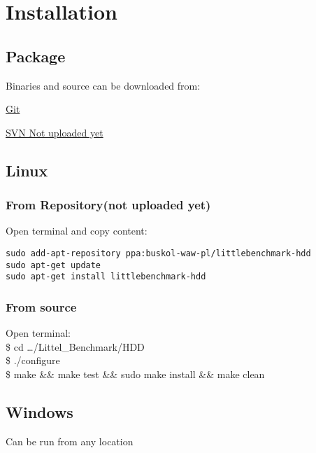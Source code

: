 \hypertarget{Installation}{
\section{Installation}
\label{Installation}
}

\subsection{Package}
Binaries and source can be downloaded from:
\begin{description}
\item \href{http://github.com/str0g/LittleBenchmark/tree/master/HDD/Release}{Git}
\item \href{https://subversion.assembla.com/svn/littlebenchmark-hdd/}{SVN Not uploaded yet}
\end{description}

\subsection{Linux}

\subsubsection{From Repository(not uploaded yet)}
Open terminal and copy content:
\begin{verbatim}
sudo add-apt-repository ppa:buskol-waw-pl/littlebenchmark-hdd
sudo apt-get update
sudo apt-get install littlebenchmark-hdd
\end{verbatim}

\subsubsection{From source}
Open terminal:\\
\$ cd \ldots/Littel\_Benchmark/HDD\\
\$ ./configure\\
\$ make \&\& make test \&\& sudo make install \&\& make clean\\
\subsection{Windows}
Can be run from any location

